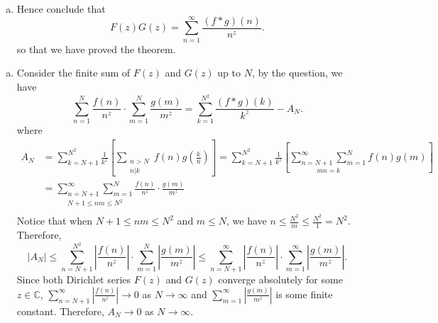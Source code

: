 \documentclass{elegantbook}
\begin{document}
\begin{problemset}[Exercises]
\begin{enumerate}[(a)]
\begin{align*}
      &=\sum_{k=1}^{N^2} \frac{(f*g)(k)}{k^z} - \sum_{k=N+1}^{N^2} \frac{1}{k^z} \left[ \sum_{\substack{n>N \\ n|k}} f(n) g\left(\frac{k}{n}\right) \right].
    \end{align*}
    Let
    \[
      A_N := \sum_{k=N+1}^{N^2} \frac{1}{k^z} \left[ \sum_{\substack{n>N \\ n|k}} f(n) g\left(\frac{k}{n}\right) \right].
    \]
    Show that
    \[
      A_N = \underset{N+1 \leq nm \leq N^2}{\sum_{n=N+1}^{\infty}\sum_{m=1}^{N}} \frac{f(n)}{n^z} \cdot \frac{g(m)}{m^z} \to 0 \quad \text{ as } N \to \infty.
    \]
    \item Hence conclude that
    \[
      F(z)G(z) = \sum_{n=1}^{\infty} \frac{(f * g)(n)}{n^z}.
    \]
    so that we have proved the theorem.
  \end{enumerate}
  \begin{solution}
    \begin{enumerate}[(a)]
      \item Consider the finite sum of $F(z)$ and $G(z)$ up to $N$, by the question, we have
      \[
        \sum^N_{n=1} \frac{f(n)} {n^z} \cdot \sum^N_{m=1} \frac{g(m)}{m^z} = \sum_{k=1}^{N^2} \frac{(f*g)(k)}{k^z} - A_N.
      \]
      where
      \[
      \begin{aligned}
        A_N &= \sum_{k=N+1}^{N^2} \frac{1}{k^z} \left[ \sum_{\substack{n>N \\ n|k}} f(n) g\left(\frac{k}{n}\right) \right]= \sum_{k=N+1}^{N^2} \frac{1}{k^z} \left[ \underset{mn = k}{\sum_{n=N+1}^{\infty} \sum_{m=1}^{N}} f(n) g(m) \right] \\
            &= \underset{N+1 \leq nm \leq N^2}{\sum_{n=N+1}^{\infty}\sum_{m=1}^{N}} \frac{f(n)}{n^z} \cdot \frac{g(m)}{m^z} \\
      \end{aligned}
      \]
      Notice that when $N+1 \leq nm \leq N^2$ and $m \leq N$, we have $n \leq \frac{N^2}{m} \leq \frac{N^2}{1} = N^2$. Therefore,
      \[
        |A_N| \leq \sum_{n=N+1}^{N^2} \left| \frac{f(n)}{n^z} \right| \cdot \sum_{m=1}^{N} \left| \frac{g(m)}{m^z} \right| \leq \sum_{n=N+1}^{\infty} \left| \frac{f(n)}{n^z} \right| \cdot \sum_{m=1}^{\infty} \left| \frac{g(m)}{m^z} \right|.
      \]
      Since both Dirichlet series $F(z)$ and $G(z)$ converge absolutely for some $z \in \mathbb{C}$, $\sum_{n=N+1}^{\infty} \left| \frac{f(n)}{n^z} \right| \to 0$ as $N \to \infty$ and $\sum_{m=1}^{\infty} \left| \frac{g(m)}{m^z} \right|$ is some finite constant. Therefore, $A_N \to 0$ as $N \to \infty$.

\end{enumerate}
\end{solution}
\end{problemset}
\end{document}
